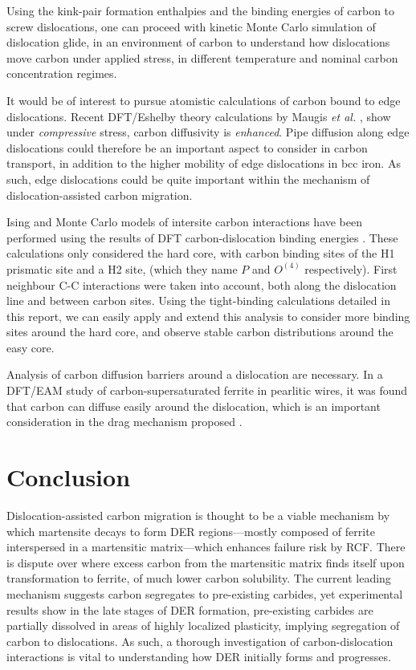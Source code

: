 \documentclass[a4paper,11pt]{article}
\begin{document}
Using the kink-pair formation enthalpies and the binding energies of carbon to screw dislocations, one can proceed
with kinetic Monte Carlo simulation of dislocation glide, in an environment of carbon to
understand how dislocations move carbon under applied stress, in different temperature
and nominal carbon concentration regimes.


It would be of interest to pursue atomistic calculations of carbon bound to edge
dislocations. Recent DFT/Eshelby theory calculations by Maugis \emph{et al.} \cite{Maugis2020}, show
under \emph{compressive} stress, carbon diffusivity is \emph{enhanced}. Pipe diffusion along edge
dislocations could therefore be an important aspect to consider in carbon transport, in addition
to the higher mobility of edge dislocations in bcc iron. As such, edge dislocations could be quite
important within the mechanism of dislocation-assisted carbon migration.

Ising and Monte Carlo models of intersite carbon interactions have been performed using the
results of DFT carbon-dislocation binding energies \cite{Lthi2019}.  These calculations only
considered the hard core, with carbon binding sites of the H1 prismatic site and a H2 site, (which
they name \(P\) and \(O^{(4)}\) respectively). First neighbour C-C interactions were taken
into account, both along the dislocation line and between carbon sites. Using the tight-binding
calculations detailed in this report, we can easily apply and extend this analysis to consider more
binding sites around the hard core, and observe stable carbon distributions around the easy core.

Analysis of carbon diffusion barriers around a dislocation are necessary. In a DFT/EAM
study of carbon-supersaturated ferrite in pearlitic wires, it was found that carbon can diffuse
easily around the dislocation, which is an important consideration in the drag mechanism proposed
\cite{Nematollahi2016}.

\section{Conclusion}
\label{sec:orga3050d6}

Dislocation-assisted carbon migration is thought to be a viable mechanism by which martensite
decays to form DER regions---mostly composed of ferrite interspersed in a martensitic
matrix---which enhances failure risk by RCF. There is dispute over where excess carbon from the
martensitic matrix finds itself upon transformation to ferrite, of much lower carbon
solubility. The current leading mechanism suggests carbon segregates to pre-existing carbides, yet
experimental results show in the late stages of DER formation, pre-existing carbides are partially
dissolved in areas of highly localized plasticity, implying segregation of carbon to
dislocations. As such, a thorough investigation of carbon-dislocation interactions is vital to
understanding how DER initially forms and progresses.
\end{document}

